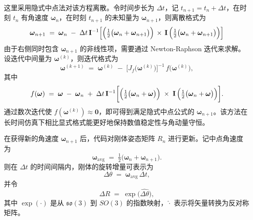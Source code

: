 这里采用隐式中点法对该方程离散。令时间步长为 $\Delta t$，记 $t_{n+1} = t_n + \Delta t$，在时刻 $t_n$ 有角速度 $\boldsymbol{\omega}_n$，在时刻 $t_{n+1}$ 的未知量为 $\boldsymbol{\omega}_{n+1}$，则离散格式为
\begin{equation}\label{eq:midpoint_formula}
	\boldsymbol{\omega}_{n+1}
	\;=\;
	\boldsymbol{\omega}_{n}
	\;-\;
	\Delta t\,\mathbf{I}^{-1}\Bigl[
	\Bigl(\tfrac12\bigl(\boldsymbol{\omega}_{n}+\boldsymbol{\omega}_{n+1}\bigr)\Bigr)
	\,\times\,
	\mathbf{I}\,\Bigl(\tfrac12\bigl(\boldsymbol{\omega}_{n}+\boldsymbol{\omega}_{n+1}\bigr)\Bigr)
	\Bigr]
\end{equation}
由于右侧同时包含 $\boldsymbol{\omega}_{n+1}$ 的非线性项，需要通过 Newton-Raphson 迭代来求解。设迭代中间量为 $\boldsymbol{\omega}^{(k)}$，则迭代格式为
\begin{equation}
	\boldsymbol{\omega}^{(k+1)}
	\;=\;
	\boldsymbol{\omega}^{(k)}
	\;-\;
	\bigl[J_f\bigl(\boldsymbol{\omega}^{(k)}\bigr)\bigr]^{-1}
	\,f\bigl(\boldsymbol{\omega}^{(k)}\bigr),
\end{equation}
其中
\begin{equation}
	f(\boldsymbol{\omega})
	\;=\;
	\boldsymbol{\omega}
	\;-\;
	\boldsymbol{\omega}_n
	\;+\;
	\Delta t\,\mathbf{I}^{-1}\biggl[
	\Bigl(\tfrac12\bigl(\boldsymbol{\omega}_n + \boldsymbol{\omega}\bigr)\Bigr)
	\;\times\;
	\mathbf{I}\,
	\Bigl(\tfrac12\bigl(\boldsymbol{\omega}_n + \boldsymbol{\omega}\bigr)\Bigr)
	\biggr].
\end{equation}
通过数次迭代使 $f(\boldsymbol{\omega}^{(k)}) \approx \mathbf{0}$，即可得到满足隐式中点公式的 $\boldsymbol{\omega}_{n+1}$。该方法在长时间仿真下相比显式格式能更好地保持数值稳定性与角动量守恒。


在获得新的角速度 $\boldsymbol{\omega}_{n+1}$ 后，代码对刚体姿态矩阵 $R_n$ 进行更新。记中点角速度为
\begin{equation}
	\boldsymbol{\omega}_{\mathrm{avg}}
	\;=\;
	\tfrac12\bigl(
	\boldsymbol{\omega}_n + \boldsymbol{\omega}_{n+1}
	\bigr).
\end{equation}
则在 $\Delta t$ 的时间间隔内，刚体的旋转增量可表示为
\begin{equation}
	\Delta \theta
	\;=\;
	\boldsymbol{\omega}_{\mathrm{avg}}\,\Delta t,
\end{equation}
并令
\begin{equation}
	\Delta R
	\;=\;
	\exp\bigl(\widehat{\Delta \theta}\bigr),
\end{equation}
其中 $\exp(\cdot)$ 是从 $\mathfrak{so}(3)$ 到 $SO(3)$ 的指数映射，$\widehat{\cdot}$ 表示将矢量转换为反对称矩阵。	

